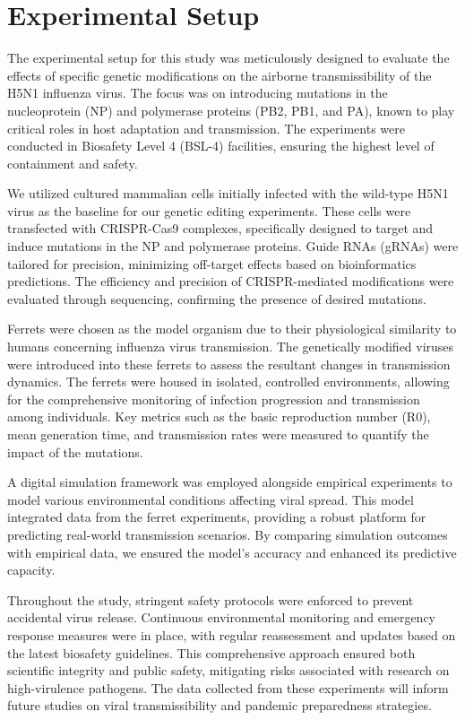 \documentclass{article}
\begin{document}
\section{Experimental Setup}
The experimental setup for this study was meticulously designed to evaluate the effects of specific genetic modifications on the airborne transmissibility of the H5N1 influenza virus. The focus was on introducing mutations in the nucleoprotein (NP) and polymerase proteins (PB2, PB1, and PA), known to play critical roles in host adaptation and transmission. The experiments were conducted in Biosafety Level 4 (BSL-4) facilities, ensuring the highest level of containment and safety.

We utilized cultured mammalian cells initially infected with the wild-type H5N1 virus as the baseline for our genetic editing experiments. These cells were transfected with CRISPR-Cas9 complexes, specifically designed to target and induce mutations in the NP and polymerase proteins. Guide RNAs (gRNAs) were tailored for precision, minimizing off-target effects based on bioinformatics predictions. The efficiency and precision of CRISPR-mediated modifications were evaluated through sequencing, confirming the presence of desired mutations.

Ferrets were chosen as the model organism due to their physiological similarity to humans concerning influenza virus transmission. The genetically modified viruses were introduced into these ferrets to assess the resultant changes in transmission dynamics. The ferrets were housed in isolated, controlled environments, allowing for the comprehensive monitoring of infection progression and transmission among individuals. Key metrics such as the basic reproduction number (R0), mean generation time, and transmission rates were measured to quantify the impact of the mutations.

A digital simulation framework was employed alongside empirical experiments to model various environmental conditions affecting viral spread. This model integrated data from the ferret experiments, providing a robust platform for predicting real-world transmission scenarios. By comparing simulation outcomes with empirical data, we ensured the model's accuracy and enhanced its predictive capacity.

Throughout the study, stringent safety protocols were enforced to prevent accidental virus release. Continuous environmental monitoring and emergency response measures were in place, with regular reassessment and updates based on the latest biosafety guidelines. This comprehensive approach ensured both scientific integrity and public safety, mitigating risks associated with research on high-virulence pathogens. The data collected from these experiments will inform future studies on viral transmissibility and pandemic preparedness strategies.
\end{document}
